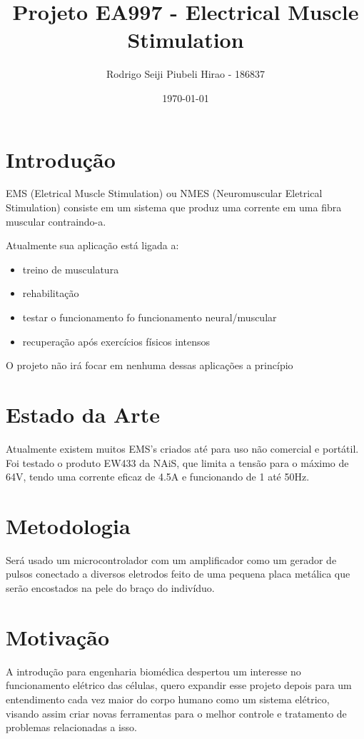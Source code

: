 \documentclass{article}
\title{Projeto EA997 - Electrical Muscle Stimulation}
\author{
    Rodrigo Seiji Piubeli Hirao - 186837
}
\date{\today}
\begin{document}
    \maketitle
    \section{Introdução}
        EMS (Eletrical Muscle Stimulation) ou 
        NMES (Neuromuscular Eletrical Stimulation) consiste em
        um sistema que produz uma corrente em uma fibra muscular contraindo-a.
        
        Atualmente sua aplicação está ligada a:
        \begin{itemize}
             \item treino de musculatura
             \item rehabilitação
             \item testar o funcionamento fo funcionamento neural/muscular
             \item recuperação após exercícios físicos intensos
        \end{itemize}

        O projeto não irá focar em nenhuma dessas aplicações a princípio
    \section{Estado da Arte}
        Atualmente existem muitos EMS's criados até para uso não comercial 
        e portátil. Foi testado o produto EW433 da NAiS, que limita a tensão
        para o máximo de 64V, tendo uma corrente eficaz de 4.5A e funcionando de 
        1 até 50Hz.

    \section{Metodologia}
        Será usado um microcontrolador com um amplificador como um 
        gerador de pulsos conectado a diversos eletrodos feito de uma 
        pequena placa metálica que serão encostados na pele do braço do
        indivíduo.

    \section{Motivação}
        A introdução para engenharia biomédica despertou um interesse
        no funcionamento elétrico das células, quero expandir esse 
        projeto depois para um entendimento cada vez maior do corpo humano 
        como um sistema elétrico, visando assim criar novas ferramentas
        para o melhor controle e tratamento de problemas relacionadas a isso.
\end{document}
